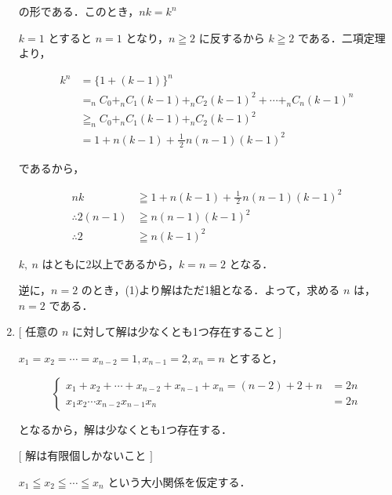 \documentclass[a4paper]{ltjsarticle}
\begin{document}
\begin{enumerate}[label=(\arabic*)]
          の形である．このとき，$nk=k^n$

          $k=1$ とすると $n=1$ となり，$n\geqq 2$ に反するから $k\geqq 2$ である．二項定理より，

          \begin{align*}
              k^n & =\{1+(k-1)\}^n                                                    \\
                  & =_{n}C_0+_{n}C_{1}(k-1)+_{n}C_{2}(k-1)^2+\cdots +_{n}C_{n}(k-1)^n \\
                  & \geqq _{n}C_0+_{n}C_{1}(k-1)+_{n}C_{2}(k-1)^2                     \\
                  & =1+n(k-1)+\frac{1}{\ 2\ }n(n-1)(k-1)^2
          \end{align*}

          であるから，

          \begin{align*}
              nk                & \geqq 1+n(k-1)+\frac{1}{\ 2\ }n(n-1)(k-1)^2 \\
              \therefore 2(n-1) & \geqq n(n-1)(k-1)^2                         \\
              \therefore 2      & \geqq n(k-1)^2
          \end{align*}

          $k,\ n$ はともに2以上であるから，$k=n=2$ となる．

          逆に，$n=2$ のとき，(1)より解はただ1組となる．よって，求める $n$ は，$n=2$ である．

    \item $\lbrack$ 任意の $n$ に対して解は少なくとも1つ存在すること $\rbrack$

          $x_1=x_2=\cdots =x_{n-2}=1, x_{n-1}=2, x_n=n$ とすると，

          \begin{equation*}
              \left\{\begin{aligned}
                  x_1+x_2+\cdots+x_{n-2}+x_{n-1}+x_n=(n-2)+2+n & =2n \\
                  x_{1}x_{2}\cdots x_{n-2}x_{n-1}x_n           & =2n
              \end{aligned}\right.
          \end{equation*}

          となるから，解は少なくとも1つ存在する．

          $\lbrack$ 解は有限個しかないこと $\rbrack$

          $x_1\leqq x_2\leqq\cdots\leqq x_n$ という大小関係を仮定する．


\end{enumerate}
\end{document}
